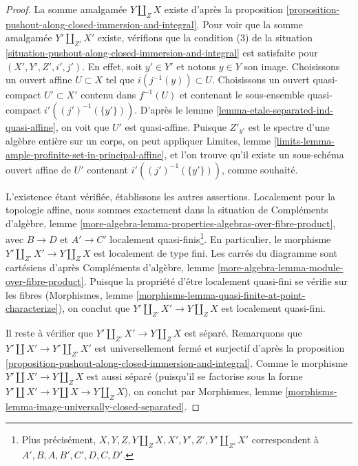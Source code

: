 \begin{proof}
La somme amalgamée $Y \amalg_Z X$ existe d'après la
proposition \ref{proposition-pushout-along-closed-immersion-and-integral}.
Pour voir que la somme amalgamée $Y' \amalg_{Z'} X'$ existe, vérifions que la
condition (3) de la
situation \ref{situation-pushout-along-closed-immersion-and-integral}
est satisfaite pour $(X', Y', Z', i', j')$.
En effet, soit $y' \in Y'$ et notons $y \in Y$ son image.
Choisissons un ouvert affine $U \subset X$ tel que $i(j^{-1}(y)) \subset U$.
Choisissons un ouvert quasi-compact $U' \subset X'$ contenu dans
$f^{-1}(U)$ et contenant le sous-ensemble quasi-compact $i'((j')^{-1}(\{y'\}))$.
D'après le lemme \ref{lemma-etale-separated-ind-quasi-affine},
on voit que $U'$ est quasi-affine. Puisque $Z'_{y'}$ est le spectre
d'une algèbre entière sur un corps, on peut appliquer
Limites, lemme \ref{limits-lemma-ample-profinite-set-in-principal-affine},
et l'on trouve qu'il existe un sous-schéma ouvert affine de $U'$ contenant
$i'((j')^{-1}(\{y'\}))$, comme souhaité.

\medskip\noindent
L'existence étant vérifiée, établissons les autres assertions.
Localement pour la topologie affine, nous sommes exactement dans la situation de Compléments d'algèbre, lemme
\ref{more-algebra-lemma-properties-algebras-over-fibre-product},
avec $B \to D$ et $A' \to C'$ localement quasi-finis\footnote{Plus précisément,
$X, Y, Z, Y \amalg_Z X, X', Y', Z', Y' \amalg_{Z'} X'$
correspondent à $A', B, A, B', C', D, C, D'$.}.
En particulier, le morphisme $Y' \amalg_{Z'} X' \to Y \amalg_Z X$ est localement
de type fini. Les carrés du diagramme sont cartésiens d'après
Compléments d'algèbre, lemme \ref{more-algebra-lemma-module-over-fibre-product}.
Puisque la propriété d'être localement quasi-fini se vérifie sur les fibres
(Morphismes, lemme \ref{morphisms-lemma-quasi-finite-at-point-characterize}),
on conclut que $Y' \amalg_{Z'} X' \to Y \amalg_Z X$
est localement quasi-fini.

\medskip\noindent
Il reste à vérifier que $Y' \amalg_{Z'} X' \to Y \amalg_Z X$ est séparé.
Remarquons que $Y' \amalg X' \to Y' \amalg_{Z'} X'$ est universellement fermé
et surjectif d'après la
proposition \ref{proposition-pushout-along-closed-immersion-and-integral}.
Comme le morphisme $Y' \amalg X' \to Y \amalg_Z X$ est aussi séparé
(puisqu'il se factorise sous la forme $Y' \amalg X' \to Y \amalg X \to Y \amalg_Z X$),
on conclut par
Morphismes, lemme \ref{morphisms-lemma-image-universally-closed-separated}.
\end{proof}

